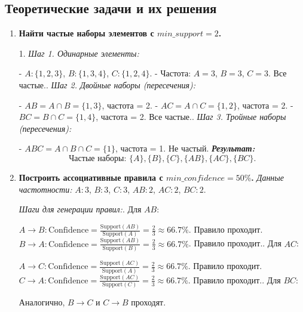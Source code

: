 \subsection{Теоретические задачи и их решения}
\bigskip
\begin{enumerate}
    \item {\textbf{Найти частые наборы элементов с \(min\_support = 2\).}\newline
    
    1. \textit{Шаг 1. Одинарные элементы:}\par
       - \(A: \{1, 2, 3\}\), \(B: \{1, 3, 4\}\), \(C: \{1, 2, 4\}\).\newline
       - Частота: \(A = 3\), \(B = 3\), \(C = 3\). Все частые.. \textit{Шаг 2. Двойные наборы (пересечения):}\par
       - \(AB = A \cap B = \{1, 3\}\), частота = 2.\newline
       - \(AC = A \cap C = \{1, 2\}\), частота = 2.\newline
       - \(BC = B \cap C = \{1, 4\}\), частота = 2.\newline
       Все частые.. \textit{Шаг 3. Тройные наборы (пересечения):}\par
       - \(ABC = A \cap B \cap C = \{1\}\), частота = 1. Не частый.\newline    
    \textbf{\textit{Результат:}}
    \[
    \text{Частые наборы: } \{A\}, \{B\}, \{C\}, \{AB\}, \{AC\}, \{BC\}.
    \]}
    \item {\textbf{Построить ассоциативные правила с \(min\_confidence = 50\%\).}\newline
    \textit{Данные частотности:}\newline
    \(A: 3\), \(B: 3\), \(C: 3\), \(AB: 2\), \(AC: 2\), \(BC: 2\).
    
    \textit{Шаги для генерации правил:}. Для \(AB\):\par 
       \(A \rightarrow B: \text{Confidence} = \frac{\text{Support}(AB)}{\text{Support}(A)} = \frac{2}{3} \approx 66.7\%\).  
         Правило проходит.\newline 
       \(B \rightarrow A: \text{Confidence} = \frac{\text{Support}(AB)}{\text{Support}(B)} = \frac{2}{3} \approx 66.7\%\).  
         Правило проходит.. Для \(AC\):\par  
       \(A \rightarrow C: \text{Confidence} = \frac{\text{Support}(AC)}{\text{Support}(A)} = \frac{2}{3} \approx 66.7\%\).  
         Правило проходит. \newline 
       \(C \rightarrow A: \text{Confidence} = \frac{\text{Support}(AC)}{\text{Support}(C)} = \frac{2}{3} \approx 66.7\%\).  
         Правило проходит.. Для \(BC\):\par
       Аналогично, \(B \rightarrow C\) и \(C \rightarrow B\) проходят.\newline
    
}
\end{enumerate}
